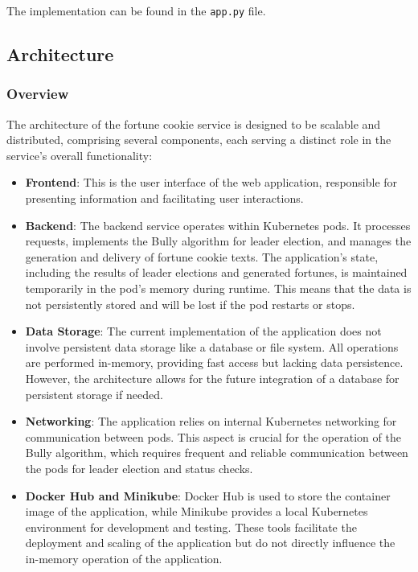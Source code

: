 \documentclass{article}
\begin{document}
    The implementation can be found in the \texttt{app.py} file.
  
    

  \subsection{Architecture}
    \subsubsection*{Overview}
    The architecture of the fortune cookie service is designed to be scalable and distributed, comprising several components, each serving a distinct role in the service's overall functionality:

    \begin{itemize}
    \item \textbf{Frontend}: This is the user interface of the web application, responsible for presenting information and facilitating user interactions.
    \item \textbf{Backend}: The backend service operates within Kubernetes pods. It processes requests, implements the Bully algorithm for leader election, and manages the generation and delivery of fortune cookie texts. The application's state, including the results of leader elections and generated fortunes, is maintained temporarily in the pod's memory during runtime. This means that the data is not persistently stored and will be lost if the pod restarts or stops.
    \item \textbf{Data Storage}: The current implementation of the application does not involve persistent data storage like a database or file system. All operations are performed in-memory, providing fast access but lacking data persistence. However, the architecture allows for the future integration of a database for persistent storage if needed.
    \item \textbf{Networking}: The application relies on internal Kubernetes networking for communication between pods. This aspect is crucial for the operation of the Bully algorithm, which requires frequent and reliable communication between the pods for leader election and status checks.
    \item \textbf{Docker Hub and Minikube}: Docker Hub is used to store the container image of the application, while Minikube provides a local Kubernetes environment for development and testing. These tools facilitate the deployment and scaling of the application but do not directly influence the in-memory operation of the application.
    \end{itemize}
\end{document}
